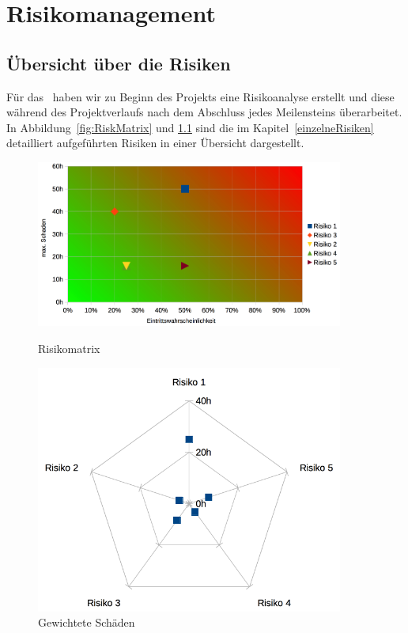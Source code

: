 \chapter{Risikomanagement}
	\label{risiken}
	
	\section{Übersicht über die Risiken}
		Für das \eeppi\ haben wir zu Beginn des Projekts eine Risikoanalyse erstellt und diese während des Projektverlaufs nach dem Abschluss jedes Meilensteins überarbeitet.
		In Abbildung~\ref{fig:RiskMatrix} und \ref{fig:RiskMatrixWeightedDamage} sind die im Kapitel~\ref{einzelneRisiken} detailliert aufgeführten Risiken in einer Übersicht dargestellt.
		
		\begin{figure}[H]
			\begin{minipage}[b]{\largeThird\linewidth}
				\includegraphics[width=0.9\textwidth]{media/spreadsheets/Risikomatrix.png}
				\centering
				\caption{Risikomatrix}
				\label{fig:RiskMatrix}
			\end{minipage}
			\begin{minipage}[b]{\smallThird\linewidth}
				\includegraphics[width=0.9\textwidth]{media/spreadsheets/RisikomatrixGewichteterSchaden.png}
				\centering
				\caption{Gewichtete Schäden}
				\label{fig:RiskMatrixWeightedDamage}
			\end{minipage}
		\end{figure}
	
